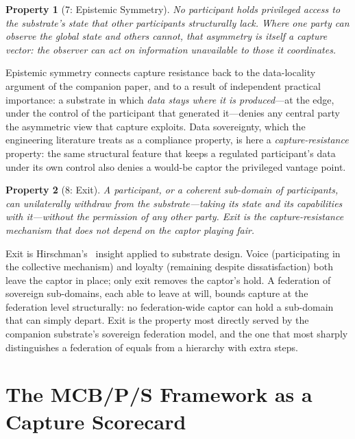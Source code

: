 \documentclass[11pt]{article}
\theoremstyle{definition}
\theoremstyle{plain}
\newtheorem*{property}{Property}
\begin{document}
\begin{property}[7: Epistemic Symmetry]
No participant holds privileged access to the substrate's state that other
participants structurally lack. Where one party can observe the global state and
others cannot, that asymmetry is itself a capture vector: the observer can act on
information unavailable to those it coordinates.
\end{property}

Epistemic symmetry connects capture resistance back to the data-locality argument
of the companion paper, and to a result of independent practical importance: a
substrate in which \emph{data stays where it is produced}---at the edge, under the
control of the participant that generated it---denies any central party the
asymmetric view that capture exploits. Data sovereignty, which the engineering
literature treats as a compliance property, is here a \emph{capture-resistance}
property: the same structural feature that keeps a regulated participant's data
under its own control also denies a would-be captor the privileged vantage point.

\begin{property}[8: Exit]
A participant, or a coherent sub-domain of participants, can unilaterally withdraw
from the substrate---taking its state and its capabilities with it---without the
permission of any other party. Exit is the capture-resistance mechanism that does
not depend on the captor playing fair.
\end{property}

Exit is Hirschman's~\cite{hirschman1970} insight applied to substrate design. Voice
(participating in the collective mechanism) and loyalty (remaining despite
dissatisfaction) both leave the captor in place; only exit removes the captor's
hold. A federation of sovereign sub-domains, each able to leave at will, bounds
capture at the federation level structurally: no federation-wide captor can hold a
sub-domain that can simply depart. Exit is the property most directly served by the
companion substrate's sovereign federation model, and the one that most sharply
distinguishes a federation of equals from a hierarchy with extra steps.

\section{The MCB/P/S Framework as a Capture Scorecard}
\label{sec:mcbps}
\end{document}
